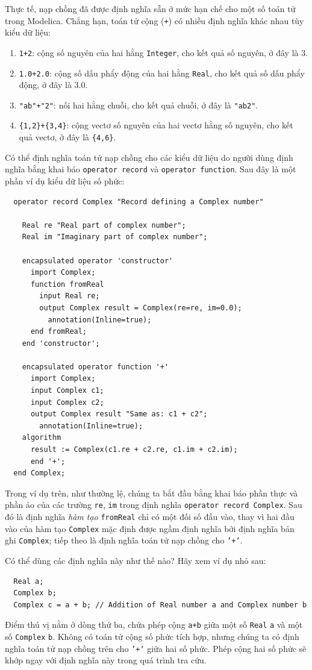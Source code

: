Thực tế, nạp chồng đã được định nghĩa sẵn ở mức hạn chế cho một số toán tử trong Modelica. Chẳng hạn, toán tử cộng (\texttt{+}) có nhiều định nghĩa khác nhau tùy kiểu dữ liệu:
\begin{enumerate}
\item \texttt{1+2}: cộng số nguyên của hai hằng \texttt{Integer}, cho kết quả số nguyên, ở đây là 3.
\item \texttt{1.0+2.0}: cộng số dấu phẩy động của hai hằng \texttt{Real}, cho kết quả số dấu phẩy động, ở đây là 3.0.
\item \texttt{"ab"+"2"}: nối hai hằng chuỗi, cho kết quả chuỗi, ở đây là \texttt{"ab2"}.
\item \texttt{\{1,2\}+\{3,4\}}: cộng vectơ số nguyên của hai vectơ hằng số nguyên, cho kết quả vectơ, ở đây là \texttt{\{4,6\}}.
\end{enumerate}
Có thể định nghĩa toán tử nạp chồng cho các kiểu dữ liệu do người dùng định nghĩa bằng khai báo \texttt{operator record} và \texttt{operator function}. Sau đây là một phần ví dụ kiểu dữ liệu số phức:
\begin{verbatim}
  operator record Complex "Record defining a Complex number"

    Real re "Real part of complex number";
    Real im "Imaginary part of complex number";

    encapsulated operator 'constructor'
      import Complex;
      function fromReal
        input Real re;
        output Complex result = Complex(re=re, im=0.0);
          annotation(Inline=true);
      end fromReal;
    end 'constructor';

    encapsulated operator function '+'
      import Complex;
      input Complex c1;
      input Complex c2;
      output Complex result "Same as: c1 + c2";
        annotation(Inline=true);
    algorithm
      result := Complex(c1.re + c2.re, c1.im + c2.im);
      end '+';
  end Complex;
\end{verbatim}
Trong ví dụ trên, như thường lệ, chúng ta bắt đầu bằng khai báo phần thực và phần ảo của các trường \texttt{re}, \texttt{im} trong định nghĩa \texttt{operator record Complex}. Sau đó là định nghĩa \emph{hàm tạo} \texttt{fromReal} chỉ có một đối số đầu vào, thay vì hai đầu vào của hàm tạo \texttt{Complex} mặc định được ngầm định nghĩa bởi định nghĩa bản ghi \texttt{Complex}; tiếp theo là định nghĩa toán tử nạp chồng cho \texttt{'+'}.

Có thể dùng các định nghĩa này như thế nào? Hãy xem ví dụ nhỏ sau:
\begin{verbatim}
  Real a;
  Complex b;
  Complex c = a + b; // Addition of Real number a and Complex number b
\end{verbatim}
Điểm thú vị nằm ở dòng thứ ba, chứa phép cộng \texttt{a+b} giữa một số \texttt{Real} \texttt{a} và một số \texttt{Complex} \texttt{b}. Không có toán tử cộng số phức tích hợp, nhưng chúng ta có định nghĩa toán tử nạp chồng trên
cho \texttt{'+'} giữa hai số phức. Phép cộng hai số phức sẽ khớp ngay với định nghĩa này trong quá trình tra cứu.

